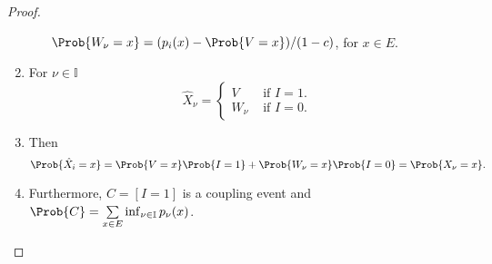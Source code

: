 \documentclass[12pt]{article}
\begin{document}
\begin{proof}
\begin{enumerate}
\begin{enumerate}
                    \( \Prob{W_{\nu} = x} = (p_i(x) - \Prob{V=x})/(1-c) \),
                    for \( x \in E \).
            \end{enumerate}
        \item
            For \( \nu \in \mathbb{I} \)
            \[
                \hat{X}_{\nu} =
                \begin{cases}
                    V & \text{ if } I = 1.  \\
                    W_{\nu} & \text{ if } I = 0.
                \end{cases}
            \]
        \item
            Then
            \[
                \Prob{\hat{X}_i = x} = \Prob{V = x}\Prob{I = 1} + \Prob{W_
                {\nu} = x}\Prob{I = 0} = \Prob{X_{\nu} = x}.
            \]
        \item
            Furthermore, \( C = [I = 1] \) is a coupling event and \(
            \Prob{C} = \sum\limits_{x \in E} \inf_{\nu \in \mathbb{I}} p_\nu
            (x) \).
    \end{enumerate}
\end{proof}
\end{document}
